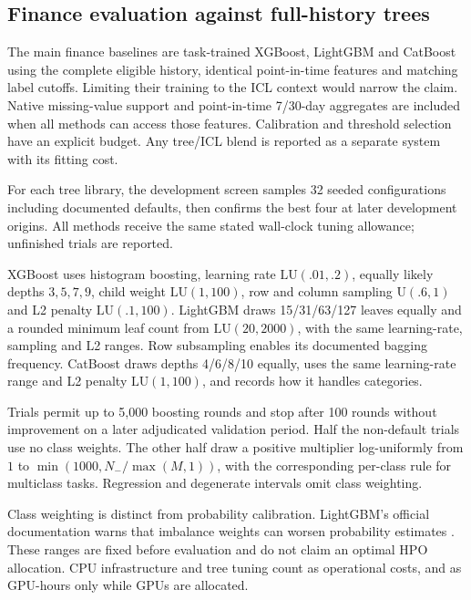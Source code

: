 \documentclass[11pt]{article}
\begin{document}
\subsection{Finance evaluation against full-history trees}

The main finance baselines are task-trained XGBoost, LightGBM and CatBoost using the complete eligible history, identical point-in-time features and matching label cutoffs. Limiting their training to the ICL context would narrow the claim. Native missing-value support and point-in-time 7/30-day aggregates are included when all methods can access those features. Calibration and threshold selection have an explicit budget. Any tree/ICL blend is reported as a separate system with its fitting cost.

For each tree library, the development screen samples 32 seeded configurations including documented defaults, then confirms the best four at later development origins. All methods receive the same stated wall-clock tuning allowance; unfinished trials are reported.

XGBoost uses histogram boosting, learning rate $\mathrm{LU}(.01,.2)$, equally likely depths $3,5,7,9$, child weight $\mathrm{LU}(1,100)$, row and column sampling $\mathrm U(.6,1)$ and L2 penalty $\mathrm{LU}(.1,100)$. LightGBM draws 15/31/63/127 leaves equally and a rounded minimum leaf count from $\mathrm{LU}(20,2000)$, with the same learning-rate, sampling and L2 ranges. Row subsampling enables its documented bagging frequency. CatBoost draws depths 4/6/8/10 equally, uses the same learning-rate range and L2 penalty $\mathrm{LU}(1,100)$, and records how it handles categories.

Trials permit up to 5,000 boosting rounds and stop after 100 rounds without improvement on a later adjudicated validation period. Half the non-default trials use no class weights. The other half draw a positive multiplier log-uniformly from $1$ to $\min(1000,N_-/\max(M,1))$, with the corresponding per-class rule for multiclass tasks. Regression and degenerate intervals omit class weighting.

Class weighting is distinct from probability calibration. LightGBM's official documentation warns that imbalance weights can worsen probability estimates \cite{lightgbm-params,xgboost-params,catboost-params}. These ranges are fixed before evaluation and do not claim an optimal HPO allocation. CPU infrastructure and tree tuning count as operational costs, and as GPU-hours only while GPUs are allocated.
\end{document}

